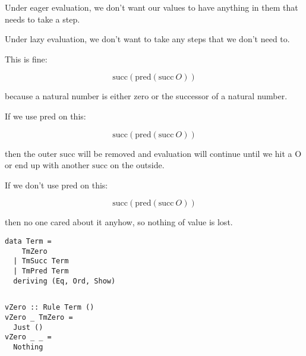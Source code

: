 \begin{frame}[c]
  Under eager evaluation, we don't want our values to have anything in them that needs to take a step.
\end{frame}

\begin{frame}[c]
  Under lazy evaluation, we don't want to take any steps that we don't need to.
\end{frame}

\begin{frame}[c]
  This is fine:

  \begin{displaymath}
  \text{succ} \left( \text{pred} \left( \text{succ}~O \right) \right)
  \end{displaymath}

  because a natural number is either zero or the successor of a natural number.
\end{frame}

\begin{frame}[c]
  If we use $\text{pred}$  on this:

  \begin{displaymath}
  \text{succ} \left( \text{pred} \left( \text{succ}~O \right) \right)
  \end{displaymath}

  then the outer $\text{succ}$ will be removed and evaluation will continue
  until we hit a $\text{O}$ or end up with another $\text{succ}$ on the outside.
\end{frame}

\begin{frame}[c]
  If we don't use $\text{pred}$  on this:

  \begin{displaymath}
  \text{succ} \left( \text{pred} \left( \text{succ}~O \right) \right)
  \end{displaymath}

  then no one cared about it anyhow, so nothing of value is lost.
\end{frame}

\begin{frame}[fragile]
  \begin{verbatim}
data Term =
    TmZero
  | TmSucc Term
  | TmPred Term
  deriving (Eq, Ord, Show)
  \end{verbatim}
\end{frame}

\begin{frame}[fragile]
  \begin{columns}
    \begin{column}{0.5\textwidth}
      \begin{verbatim}
vZero :: Rule Term ()
vZero _ TmZero =
  Just ()
vZero _ _ =
  Nothing
      \end{verbatim}
    \end{column}
    \begin{column}{0.5\textwidth}
  \infrule[V-Zero]
         {}
        { ~ }
    \end{column}
  \end{columns}
\end{frame}

